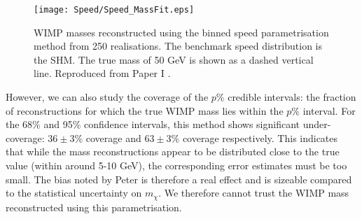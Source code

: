  \begin{figure}[t]
\centering
  \texttt{[image: Speed/Speed\_MassFit.eps]}
  \caption[Distribution of reconstructed WIMP masses using the binned speed parametrisation]{WIMP masses reconstructed using the binned speed parametrisation method from 250 realisations. The benchmark speed distribution is the SHM. The true mass of 50 GeV is shown as a dashed vertical line. Reproduced from Paper I \cite{Kavanagh:2012}.}
  \label{fig:Speed:Speed_MassFit}
\end{figure}

However, we can also study the coverage of the $p\%$ credible intervals: the fraction of reconstructions for which the true WIMP mass lies within the $p\%$ interval. For the 68\% and 95\% confidence intervals, this method shows significant under-coverage: \(36 \pm 3 \%\) coverage and \(63 \pm 3 \%\) coverage respectively. This indicates that while the mass reconstructions appear to be distributed close to the true value (within around 5-10 GeV), the corresponding error estimates must be too small.  The bias noted by Peter is therefore a real effect and is sizeable compared to the statistical uncertainty on $m_\chi$. We therefore cannot trust the WIMP mass reconstructed using this parametrisation.


